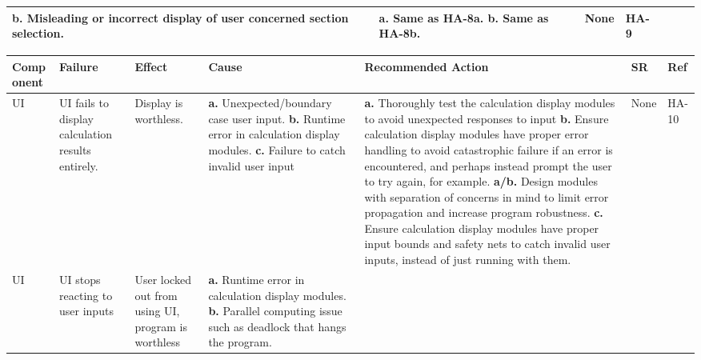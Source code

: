\documentclass{article}
\begin{document}
\begin{landscape}
\begin{table}[H]
\begin{tabular}{|p{} | p{} | p{} | p{} | p{} | p{} | p{}|}
      \textbf{b.} Misleading or incorrect display of user concerned section selection.
      &\textbf{a.} Same as HA-8a.\newline
      \textbf{b.} Same as HA-8b.
      &None&HA-9\\
  \bottomrule
    \end{tabular}
    \end{table}
    \pagebreak
    \begin{table}[H]
    \begin{tabular}{|p{} | p{} | p{} | p{} | p{} | p{} | p{}|}
        \toprule
        \textbf{Comp onent} & \textbf{Failure} & \textbf{Effect} & \textbf{Cause} & \textbf{Recommended Action} & \textbf{SR} & \textbf{Ref}\\
    \midrule
        UI &  UI fails to display calculation results entirely. &  Display is worthless.
      & \textbf{a.} Unexpected/boundary case user input.\newline               
        \textbf{b.} Runtime error in calculation display modules.\newline
        \textbf{c.} Failure to catch invalid user input

      & \textbf{a.} Thoroughly test the calculation display modules to avoid unexpected responses to input\newline
        \textbf{b.}  Ensure calculation display modules have proper error handling to avoid catastrophic failure if an error is encountered, and perhaps instead prompt
        the user to try again, for example.\newline
        \textbf{a/b.} Design modules with separation of concerns in mind to limit error propagation and increase program robustness.\newline
        \textbf{c.} Ensure calculation display modules have proper input bounds and safety nets to catch invalid user inputs, instead of just running with them.
      &None&HA-10\\
    \midrule
        UI&UI stops reacting to user inputs&User locked out from using UI, program is worthless
      & \textbf{a.} Runtime error in calculation display modules.\newline
        \textbf{b.} Parallel computing issue such as deadlock that hangs the program.
 

\end{tabular}
\end{table}
\end{landscape}
\end{document}
